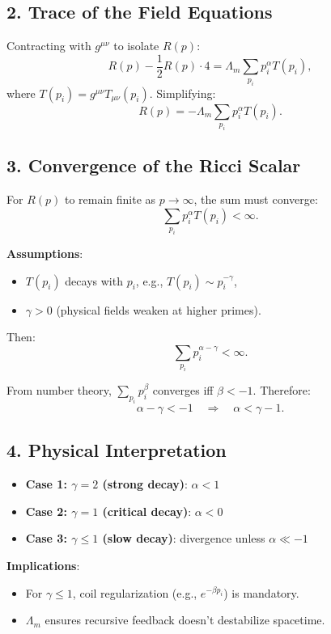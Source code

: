 \documentclass{article}
\theoremstyle{plain}
\theoremstyle{claimstyle}
\begin{document}
\subsection*{2. Trace of the Field Equations}

Contracting with \( g^{\mu\nu} \) to isolate \( R(p) \):
\[
R(p) - \frac{1}{2} R(p) \cdot 4 = \Lambda_m \sum_{p_i} p_i^\alpha T(p_i),
\]
where \( T(p_i) = g^{\mu\nu} T_{\mu\nu}(p_i) \). Simplifying:
\[
R(p) = -\Lambda_m \sum_{p_i} p_i^\alpha T(p_i).
\]

\subsection*{3. Convergence of the Ricci Scalar}

For \( R(p) \) to remain finite as \( p \to \infty \), the sum must converge:
\[
\sum_{p_i} p_i^\alpha T(p_i) < \infty.
\]

\textbf{Assumptions}:
\begin{itemize}
    \item \( T(p_i) \) decays with \( p_i \), e.g., \( T(p_i) \sim p_i^{-\gamma} \),
    \item \( \gamma > 0 \) (physical fields weaken at higher primes).
\end{itemize}

Then:
\[
\sum_{p_i} p_i^{\alpha - \gamma} < \infty.
\]

From number theory, \( \sum_{p_i} p_i^\beta \) converges iff \( \beta < -1 \). Therefore:
\[
\alpha - \gamma < -1 \quad \Rightarrow \quad \boxed{\alpha < \gamma - 1}.
\]

\subsection*{4. Physical Interpretation}

\begin{itemize}
    \item \textbf{Case 1: \( \gamma = 2 \) (strong decay)}: \( \alpha < 1 \)
    \item \textbf{Case 2: \( \gamma = 1 \) (critical decay)}: \( \alpha < 0 \)
    \item \textbf{Case 3: \( \gamma \leq 1 \) (slow decay)}: divergence unless \( \alpha \ll -1 \)
\end{itemize}

\textbf{Implications}:
\begin{itemize}
    \item For \( \gamma \leq 1 \), coil regularization (e.g., \( e^{-\beta p_i} \)) is mandatory.
    \item \( \Lambda_m \) ensures recursive feedback doesn’t destabilize spacetime.
\end{itemize}
\end{document}
